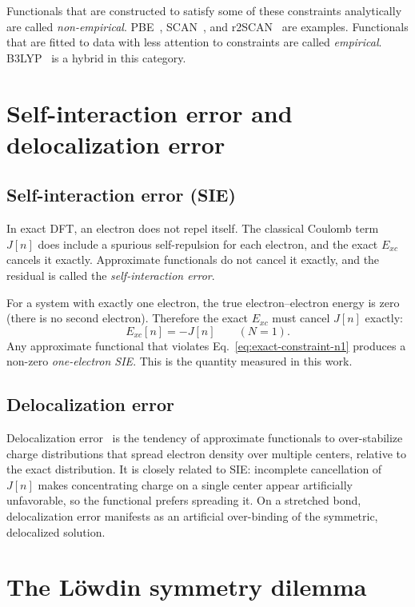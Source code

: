 \documentclass[11pt]{report}
\theoremstyle{definition}
\theoremstyle{remark}
\newcommand{\Exc}{E_{xc}}
\begin{document}
Functionals that are constructed to satisfy some of these constraints
analytically are called \emph{non-empirical}. PBE~\cite{PBE1996}, SCAN~\cite{SCAN2015}, and r2SCAN~\cite{r2SCAN2020} are
examples. Functionals that are fitted to data with less attention to
constraints are called \emph{empirical}. B3LYP~\cite{B3LYP1994} is a hybrid in this category.

\section{Self-interaction error and delocalization error}

\subsection{Self-interaction error (SIE)}

In exact DFT, an electron does not repel itself. The classical Coulomb
term $J[n]$ does include a spurious self-repulsion for each electron, and
the exact $\Exc$ cancels it exactly. Approximate functionals do not cancel
it exactly, and the residual is called the \emph{self-interaction error}.

For a system with exactly one electron, the true electron--electron energy
is zero (there is no second electron). Therefore the exact $\Exc$ must
cancel $J[n]$ exactly:
\begin{equation}
\Exc[n] = -J[n] \qquad (N = 1).
\label{eq:exact-constraint-n1}
\end{equation}
Any approximate functional that violates Eq.~\eqref{eq:exact-constraint-n1}
produces a non-zero \emph{one-electron SIE}. This is the quantity measured
in this work.

\subsection{Delocalization error}

Delocalization error~\cite{CMSY2008,CMSY2012} is the tendency of approximate functionals to
over-stabilize charge distributions that spread electron density over
multiple centers, relative to the exact distribution. It is closely related
to SIE: incomplete cancellation of $J[n]$ makes concentrating charge on a
single center appear artificially unfavorable, so the functional prefers
spreading it. On a stretched bond, delocalization error manifests as an
artificial over-binding of the symmetric, delocalized solution.

\section{The L\"owdin symmetry dilemma}
\end{document}
